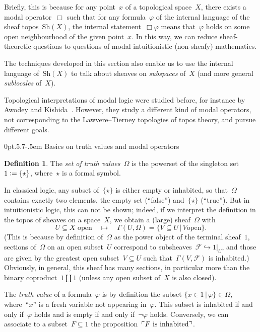 \documentclass[10pt,reqno,a4paper]{amsbook}
\makeatletter
\theoremstyle{definition}
\newtheorem{defn}{Definition}[section]
\theoremstyle{plain}
\theoremstyle{remark}
\newcommand{\F}{\mathcal{F}}
\newcommand{\Sh}{\mathrm{Sh}}
\newcommand{\?}{\,{:}\,}
\renewcommand{\_}{\mathpunct{.}\,}
\newcommand{\speak}[1]{\ulcorner\text{\textnormal{#1}}\urcorner}
\newcommand{\defeq}{\vcentcolon=}
\def\subsection{\@startsection{subsection}{2}%
  {0pt}{.5\linespacing\@plus.7\linespacing}{-.5em}%
  {\normalfont\bfseries}}
\makeatother
\begin{document}
Briefly, this is because for any point~$x$ of a topological space~$X$, there
exists a modal operator~$\Box$ such that for any formula~$\varphi$ of the
internal language of the sheaf topos~$\Sh(X)$, the internal
statement~$\Box\varphi$ means that~$\varphi$ holds on some open neighbourhood
of the given point~$x$. In this way, we can reduce sheaf-theoretic questions to
questions of modal intuitionistic (non-sheafy) mathematics.

The techniques developed in this section also enable us to use the internal
language of~$\Sh(X)$ to talk about sheaves on \emph{subspaces} of~$X$ (and more
general \emph{sublocales} of~$X$).

Topological interpretations of modal logic were studied before, for instance by
Awodey and Kishida~\cite{awodey-kishida:modal}. However, they study a
different kind of modal operators, not corresponding to the Lawvere--Tierney
topologies of topos theory, and pursue different goals.


\subsection{Basics on truth values and modal operators}
\label{sect:basics-on-truth-values}

\begin{defn}The \emph{set of truth values~$\Omega$} is the powerset of the
singleton set~$1 \defeq \{\star\}$, where~$\star$ is a formal symbol.\end{defn}

In classical logic, any subset of~$\{\star\}$ is either empty or inhabited, so
that~$\Omega$ contains exactly two elements, the empty set (``false'')
and~$\{\star\}$ (``true''). But
in intuitionistic logic, this can not be shown; indeed, if we interpret the
definition in the topos of sheaves on a space~$X$, we obtain a (large) sheaf~$\Omega$
with
\[ \text{$U \subseteq X$ open} \quad\longmapsto\quad \Gamma(U,\Omega) = \{ V \subseteq U \,|\, \text{$V$
open} \}. \]
(This is because by definition of~$\Omega$ as the power object of the terminal
sheaf~$1$, sections of~$\Omega$ on an open subset~$U$ correspond to
subsheaves~$\F \hookrightarrow 1|_U$, and those are given by the greatest open
subset~$V \subseteq U$ such that~$\Gamma(V,\F)$ is inhabited.)
Obviously, in general, this sheaf has many sections, in particular more than
the binary coproduct~$1 \amalg 1$ (unless any open subset of~$X$ is also
closed).

The \emph{truth value} of a formula~$\varphi$ is by definition the subset
$\{ x \in 1 \,|\, \varphi \} \in \Omega$, where~``$x$'' is a fresh variable not
appearing in~$\varphi$. This subset is inhabited if and only
if~$\varphi$ holds and is empty if and only if~$\neg\varphi$ holds.
Conversely, we can associate to a subset~$F \subseteq 1$ the
proposition~$\speak{$F$ is inhabited}$.
\end{document}
